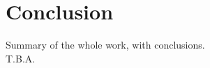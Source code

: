 \documentclass[main.tex]{subfiles}
\begin{document}
    \chapter{Conclusion}\label{chap:conclusion}
    Summary of the whole work, with conclusions.
    \\
    T.B.A. %
\end{document}
